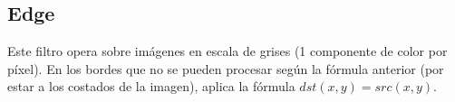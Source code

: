\subsection{Edge}

 







Este filtro opera sobre imágenes en escala de grises (1 componente de color por píxel).
En los bordes que no se pueden procesar según la fórmula anterior (por estar a los costados de la
imagen), aplica la fórmula $dst(x, y) = src(x,y)$.


